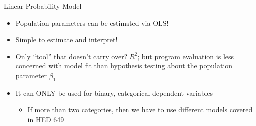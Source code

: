\documentclass[
  8pt,
  ignorenonframetext,
  dvipsnames]{beamer}
\providecommand{\tightlist}{%
  \setlength{\itemsep}{0pt}\setlength{\parskip}{0pt}}
\let\olditem\item
\renewcommand{\item}{%
  \olditem\vspace{4pt}
}
\begin{document}
\begin{frame}{Linear Probability Model}
\begin{itemize}
  \begin{itemize}
  \tightlist
  \item
    Population parameters can be estimated via OLS!
  \item
    Simple to estimate and interpret!
  \item
    Only ``tool'' that doesn't carry over? \(R^2\); but program
    evaluation is less concerned with model fit than hypothesis testing
    about the population parameter \(\beta_1\)
  \item
    It can ONLY be used for binary, categorical dependent variables

    \begin{itemize}
    \tightlist
    \item
      If more than two categories, then we have to use different models
      covered in HED 649
    \end{itemize}
  \end{itemize}
\end{itemize}

\end{frame}
\end{document}
